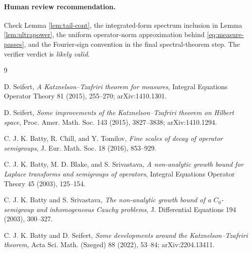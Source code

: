 \documentclass[11pt]{article}
\begin{document}
\paragraph{Human review recommendation.}
Check Lemma \ref{lem:tail-cont}, the integrated-form spectrum inclusion in
Lemma \ref{lem:ultrapower}, the uniform operator-norm approximation behind
\eqref{eq:measure-passes}, and the Fourier-sign convention in the final
spectral-theorem step. The verifier verdict is \emph{likely valid}.

\begin{thebibliography}{9}

D. Seifert,
\emph{A Katznelson--Tzafriri theorem for measures},
Integral Equations Operator Theory 81 (2015), 255--270;
arXiv:1410.1301.

D. Seifert,
\emph{Some improvements of the Katznelson--Tzafriri theorem on Hilbert
space}, Proc. Amer. Math. Soc. 143 (2015), 3827--3838;
arXiv:1410.1294.

C. J. K. Batty, R. Chill, and Y. Tomilov,
\emph{Fine scales of decay of operator semigroups},
J. Eur. Math. Soc. 18 (2016), 853--929.

C. J. K. Batty, M. D. Blake, and S. Srivastava,
\emph{A non-analytic growth bound for Laplace transforms and semigroups of
operators}, Integral Equations Operator Theory 45 (2003), 125--154.

C. J. K. Batty and S. Srivastava,
\emph{The non-analytic growth bound of a \(C_0\)-semigroup and inhomogeneous
Cauchy problems}, J. Differential Equations 194 (2003), 300--327.

C. J. K. Batty and D. Seifert,
\emph{Some developments around the Katznelson--Tzafriri theorem},
Acta Sci. Math. (Szeged) 88 (2022), 53--84; arXiv:2204.13411.

\end{thebibliography}
\end{document}
